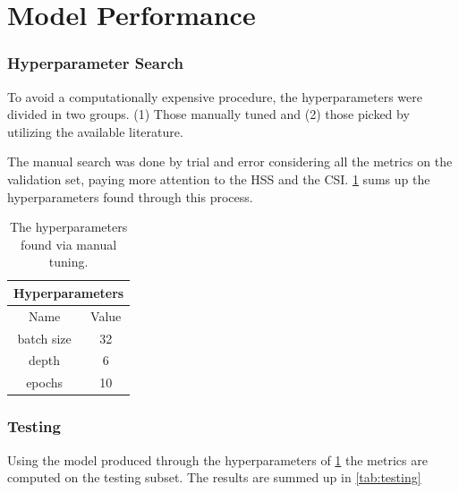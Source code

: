 \section{Model Performance}
\subsubsection{Hyperparameter Search}\label{hyperparametersearch}
To avoid a computationally expensive procedure, the hyperparameters were divided in two groups. (1) Those manually tuned and (2) those picked by utilizing the available literature.

The manual search was done by trial and error considering all the metrics on the validation set, paying more attention to the HSS and the CSI. \cref{tab:hyperparameters} sums up the hyperparameters found through this process. 

\begin{table}[!h]
    \centering
    \begin{tabular}{cc}
        \hline
        \multicolumn{2}{c}{Hyperparameters} \\
        \hline
        \hline
         Name & Value \\
         batch size & 32 \\
         depth & 6 \\
         epochs & 10 \\
        \hline
    \end{tabular}
    \caption{The hyperparameters found via manual tuning.}
    \label{tab:hyperparameters}
\end{table}

\subsubsection{Testing}
Using the model produced through the hyperparameters of \cref{tab:hyperparameters} the metrics are computed on the testing subset. The results are summed up in \cref{tab:testing}

